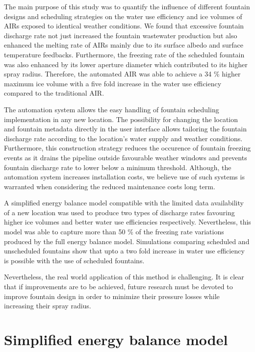 \documentclass[tc, manuscript]{copernicus}
\begin{document}
The main purpose of this study was to quantify the influence of different fountain designs and scheduling
strategies on the water use efficiency and ice volumes of AIRs exposed to identical weather conditions. We found
that excessive fountain discharge rate not just increased the fountain wastewater production but also enhanced
the melting rate of AIRs mainly due to its surface albedo and surface temperature feedbacks. Furthermore, the
freezing rate of the scheduled fountain was also enhanced by its lower aperture diameter which contributed to
its higher spray radius. Therefore, the automated AIR was able to achieve a 34 \% higher maximum ice volume with
a five fold increase in the water use efficiency compared to the traditional AIR.

The automation system allows the easy handling of fountain scheduling implementation in any new location. The
possibility for changing the location and fountain metadata directly in the user interface allows tailoring the
fountain discharge rate according to the location's water supply and weather conditions. Furthermore, this
construction strategy reduces the occurence of fountain freezing events as it drains the pipeline outside
favourable weather windows and prevents fountain discharge rate to lower below a minimum threshold. Although,
the automation system increases installation costs, we believe use of such systems is warranted when considering
the reduced maintenance costs long term.

A simplified energy balance model compatible with the limited data availability of a new location was used to
produce two types of discharge rates favouring higher ice volumes and better water use efficiencies
respectively. Nevertheless, this model was able to capture more than 50 \% of the freezing rate variations
produced by the full energy balance model. Simulations comparing scheduled and unscheduled fountains show that
upto a two fold increase in water use efficiency is possible with the use of scheduled fountains.

Nevertheless, the real world application of this method is challenging. It is clear that if improvements are to
be achieved, future research must be devoted to improve fountain design in order to minimize their pressure
losses while increasing their spray radius.

\appendix

\section{Simplified energy balance model}\label{sec:SEB}
\end{document}
